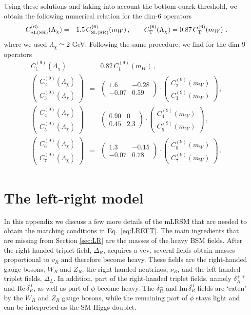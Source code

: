 \documentclass[letterpaper,11pt]{article}
\newcommand{\dt}{\delta}
\newcommand{\Dt}{\Delta}
\newcommand{\bea}{\begin{eqnarray}}
\newcommand{\eea}{\end{eqnarray}}
\newcommand{\bma}{\begin{pmatrix}}
\newcommand{\ema}{\end{pmatrix}}
\newcommand{\nn}{\nonumber}
\begin{document}
Using these solutions and taking into account the bottom-quark threshold, we obtain the following numerical relation for the dim-6 operators
\bea
C_{\rm SL(SR)}^{(6)}(\Lambda_\chi) &=& 1.5\, C_{\rm SL(SR)}^{(6)}(m_W)\,,\qquad C_{\rm T}^{(6)}(\Lambda_\chi)=0.87\,C_{\rm T}^{(6)}(m_W)\,\,.\nn
\eea
where we used $\Lambda_\chi\simeq 2$ GeV. Following the same procedure, we find for the dim-9 operators 
\bea
C_1^{(9)}(\Lambda_\chi) &=& 0.82\, C_1^{(9)}(m_W)\,,\nn\\
\bma C_2^{(9)}(\Lambda_\chi)\\C_3^{(9)}(\Lambda_\chi)\ema  &=& \bma
1.6 & -0.28\\
-0.07 & 0.59
\ema
\cdot \bma C_2^{(9)}(m_W)\\C_3^{(9)}(m_W)\ema\,, \nn\\
\bma C_4^{(9)}(\Lambda_\chi)\\C_5^{(9)}(\Lambda_\chi)\ema  &=& \bma
0.90 & 0\\
0.45& 2.3
\ema
\cdot \bma C_4^{(9)}(m_W)\\C_5^{(9)}(m_W)\ema\,, \nn\\
\bma C_6^{(9)}(\Lambda_\chi)\\C_7^{(9)}(\Lambda_\chi)\ema  &=& \bma
1.3 & -0.15\\
-0.07 &0.78
\ema
\cdot \bma C_6^{(9)}(m_W)\\C_7^{(9)}(m_W)\ema\,. \nn\\
\eea

\section{The left-right model}\label{App:LR}
In this appendix we discuss a few more details of the mLRSM that are needed to obtain the matching conditions in Eq.\ \eqref{eq:LREFT}. The main ingredients that are missing from Section \ref{sec:LR} are the masses of the heavy BSM fields. After the right-handed triplet field, $\Dt_R$, acquires a vev, several fields obtain masses proportional to $v_R$ and therefore become heavy. These fields are the right-handed gauge bosons, $W_R$ and $Z_R$, the right-handed neutrinos, $\nu_R$, and the left-handed triplet fields, $\Dt_L$. In addition, part of the right-handed triplet fields, namely $\dt_R^{++}$ and Re$\,\dt_R^0$, as well as part of $\phi$ become heavy. The $\dt_R^\pm$ and Im$\,\dt_R^0$ fields are `eaten' by the  $W_R$ and $Z_R$ gauge bosons, while the remaining part of $\phi$ stays light and can be interpreted as the SM Higgs doublet. 
\end{document}

